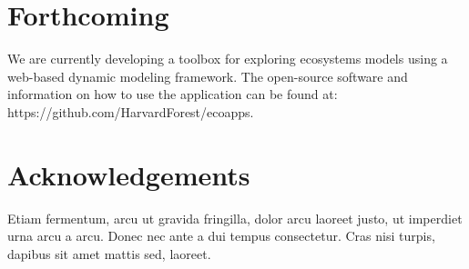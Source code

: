 \documentclass[a0,landscape]{a0poster}
\begin{document}
\begin{multicols}{4}
\color{DarkSlateGray} %


\section*{Forthcoming}

We are currently developing a toolbox for exploring ecosystems models
using a web-based dynamic modeling framework. The open-source software
and information on how to use the application can be found at:
https://github.com/HarvardForest/ecoapps.


\nocite{*} %


\section*{Acknowledgements}

Etiam fermentum, arcu ut gravida fringilla, dolor arcu laoreet justo, ut imperdiet urna arcu a arcu. Donec nec ante a dui tempus consectetur. Cras nisi turpis, dapibus sit amet mattis sed, laoreet.


\end{multicols}
\end{document}
